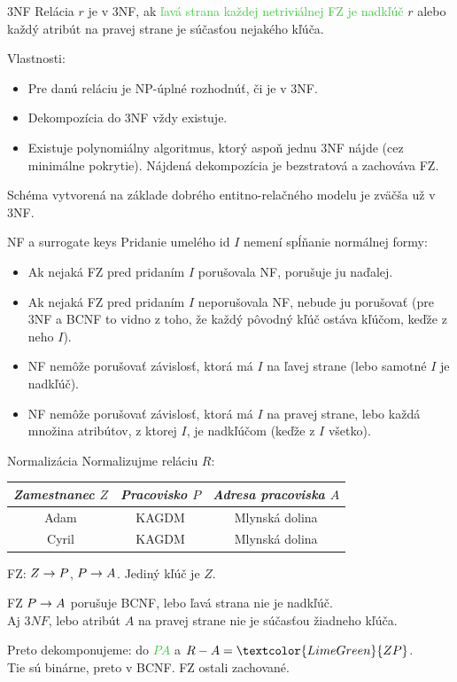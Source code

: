 \documentclass[12pt]{beamer}
\def\green#1{\textcolor{LimeGreen}{#1}}
\begin{document}
\begin{frame}[fragile]{3NF}
Relácia $r$ je v 3NF, ak \green{ľavá strana každej netriviálnej FZ je nadkľúč} $r$
alebo každý atribút na pravej strane je súčasťou nejakého kľúča.

\bigskip
Vlastnosti:
\begin{itemize}
\item Pre danú reláciu je NP-úplné rozhodnúť, či je v 3NF.
\item Dekompozícia do 3NF vždy existuje.
\item Existuje polynomiálny algoritmus, ktorý aspoň jednu 3NF nájde (cez minimálne pokrytie).
Nájdená dekompozícia je bezstratová a zachováva FZ.
\end{itemize}

\bigskip
Schéma vytvorená na základe dobrého entitno-relačného modelu je zväčša už v 3NF.
\end{frame}

\begin{frame}[fragile]{NF a surrogate keys}
Pridanie umelého id $I$ nemení spĺňanie normálnej formy:
\begin{itemize}
\item Ak nejaká FZ pred pridaním $I$ porušovala NF, porušuje ju naďalej.
\item Ak nejaká FZ pred pridaním $I$ neporušovala NF, nebude ju porušovať
    (pre 3NF a BCNF to vidno z toho, že každý pôvodný kľúč ostáva kľúčom, keďže z neho  $I$).
\item NF nemôže porušovať závislosť, ktorá má $I$ na ľavej strane (lebo samotné $I$ je nadkľúč).
\item NF nemôže porušovať závislosť, ktorá má $I$ na pravej strane,
lebo každá množina atribútov, z ktorej  $I$, je nadkľúčom (keďže z $I$  všetko).
\end{itemize}
\end{frame}

\begin{frame}[fragile]{Normalizácia}
Normalizujme reláciu $R$:\\[2mm]
\begin{tabular}{|c|c|c|}
\hline
\emph{Zamestnanec $Z$} & \emph{Pracovisko $P$} & \emph{Adresa pracoviska $A$} \\\hline
Adam & KAGDM & Mlynská dolina \\\hline
Cyril & KAGDM & Mlynská dolina \\\hline
\end{tabular}
\pause

\bigskip
FZ: $Z\rightarrow P$, $P\rightarrow A$. Jediný kľúč je $Z$.

\bigskip
FZ \alert{$P\rightarrow A$} porušuje BCNF, lebo ľavá strana nie je nadkľúč.\\
Aj $3NF$, lebo atribút $A$ na pravej strane nie je súčasťou žiadneho kľúča.

\bigskip
Preto dekomponujeme: do \green{$PA$} a $R - A = \green{ZP}$.\\
Tie sú binárne, preto v BCNF. FZ ostali zachované.
\end{frame}
\end{document}
